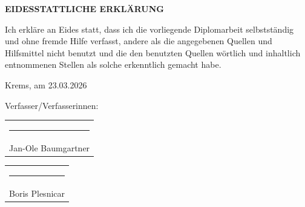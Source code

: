 \vspace*{2cm}
\begin{center}
\textbf{EIDESSTATTLICHE ERKLÄRUNG}
\end{center}
\begin{center}
\begin{minipage}[c]{9cm}
	Ich erkläre an Eides statt, dass ich die vorliegende Diplomarbeit selbstständig und ohne fremde Hilfe verfasst, andere als die angegebenen Quellen und Hilfsmittel nicht benutzt und die den benutzten Quellen wörtlich und inhaltlich entnommenen Stellen als solche erkenntlich gemacht habe.
\end{minipage}
\end{center}

\vspace{3cm}
\begin{minipage}[t]{8cm}
\vspace{0pt}
\begin{flushleft}
Krems, am 23.03.2026
\vspace*{0.5cm}
\end{flushleft}
\end{minipage}
\hfill
\begin{minipage}[t]{8cm}
\vspace{0pt}
\begin{flushright}
Verfasser/Verfasserinnen:\\
\vspace*{2.5cm}
\hspace{1cm}

\hspace*{\fill}\begin{tabular}{c}
\rule{4cm}{0.4pt}\\
Jan-Ole Baumgartner
\end{tabular}

\vspace*{3cm}

\hspace*{\fill}\begin{tabular}{c}
\rule{4cm}{0.4pt}\\
Boris Plesnicar
\end{tabular}

\end{flushright}
\vspace*{1.5cm}
\end{minipage}